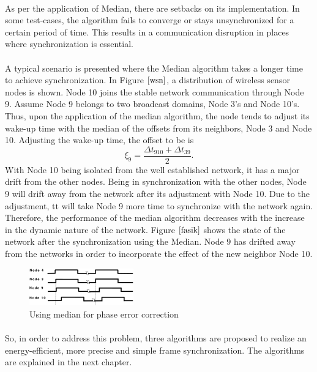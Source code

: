 \documentclass[a4paper,10pt]{report}
\begin{document}
\paragraph*{} \noindent 
As per the application of Median, there are setbacks on its implementation. In some test-cases, the algorithm fails to converge or stays unsynchronized for a certain period of time. This results in a  communication disruption in places where synchronization is essential.
\paragraph*{} A typical scenario is presented where the Median algorithm takes a longer time to achieve synchronization. In Figure
$\ref{wsn}$, a distribution of wireless sensor nodes is shown. Node 10 joins the stable network communication through Node 9. Assume Node 9 belongs to two broadcast domains, Node 3's and Node 10's. Thus, upon the application of the median algorithm, the node tends to
adjust its wake-up time with the median of the offsets from its neighbors, Node 3 and Node 10. Adjusting the wake-up time, the offset to be is
\begin{equation}
\xi_9 = \frac{\Delta t_{910} + \Delta t_{39}}{2}.
\end{equation}
With Node 10 being isolated from the well established network, it has a major drift from the other nodes. Being in synchronization
with the other nodes, Node 9 will drift away from the network after its adjustment with Node 10. Due to the adjustment, tt will take Node 9 more time to synchronize with the network again. Therefore, the performance of the median algorithm decreases with the increase in the dynamic nature of the network. Figure $\ref{fasik}$ shows the state of the network after the synchronization using the Median. Node 9 has drifted away from the networks in order to incorporate the effect of the new neighbor Node 10.
\begin{figure}
\centering
\includegraphics[width= 0.4\textwidth]{offsetpic}
\caption{Using median for phase error correction} \label{fasik}
\end{figure}
\paragraph*{}
So, in order to address this problem, three algorithms are proposed to realize an energy-efficient, more precise and simple frame synchronization. The algorithms are explained in the next chapter.
\end{document}
